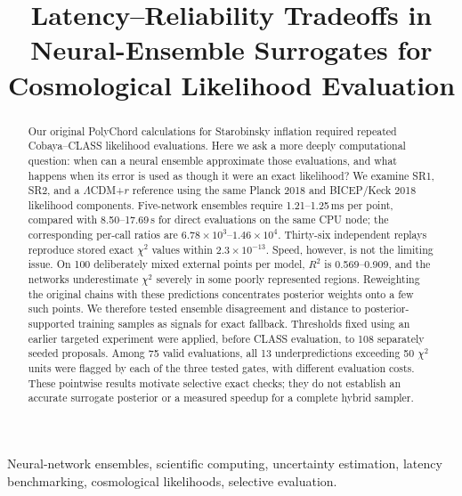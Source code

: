 \documentclass[a4paper,conference,10pt]{IEEEtran}
\begin{document}
\title{Latency--Reliability Tradeoffs in Neural-Ensemble Surrogates for Cosmological Likelihood Evaluation}
\author{
}
\maketitle
\begin{abstract}
Our original PolyChord calculations for Starobinsky inflation required repeated Cobaya--CLASS likelihood evaluations. Here we ask a more deeply computational question: when can a neural ensemble approximate those evaluations, and what happens when its error is used as though it were an exact likelihood? We examine SR1, SR2, and a $\Lambda$CDM+$r$ reference using the same Planck 2018 and BICEP/Keck 2018 likelihood components. Five-network ensembles require 1.21--1.25\,ms per point, compared with 8.50--17.69\,s for direct evaluations on the same CPU node; the corresponding per-call ratios are $6.78\times10^3$--$1.46\times10^4$. Thirty-six independent replays reproduce stored exact $\chi^2$ values within $2.3\times10^{-13}$. Speed, however, is not the limiting issue. On 100 deliberately mixed external points per model, $R^2$ is 0.569--0.909, and the networks underestimate $\chi^2$ severely in some poorly represented regions. Reweighting the original chains with these predictions concentrates posterior weights onto a few such points. We therefore tested ensemble disagreement and distance to posterior-supported training samples as signals for exact fallback. Thresholds fixed using an earlier targeted experiment were applied, before CLASS evaluation, to 108 separately seeded proposals. Among 75 valid evaluations, all 13 underpredictions exceeding 50 $\chi^2$ units were flagged by each of the three tested gates, with different evaluation costs. These pointwise results motivate selective exact checks; they do not establish an accurate surrogate posterior or a measured speedup for a complete hybrid sampler.
\end{abstract}
\begin{IEEEkeywords}
Neural-network ensembles, scientific computing, uncertainty estimation, latency benchmarking, cosmological likelihoods, selective evaluation.
\end{IEEEkeywords}
\end{document}

